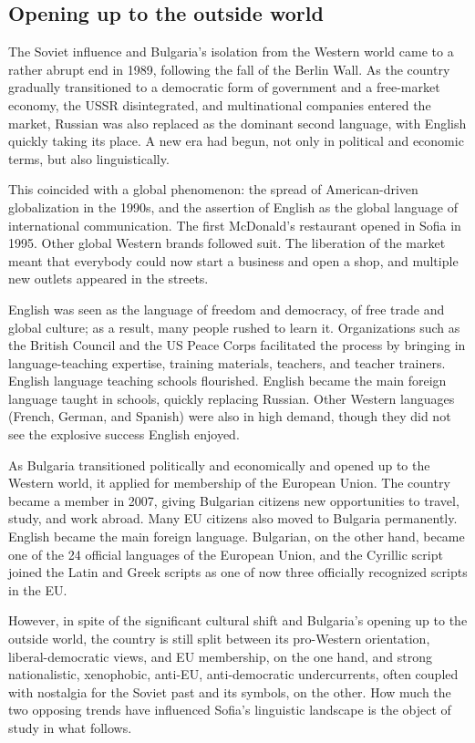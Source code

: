 \documentclass[output=paper]{langscibook}
\begin{document}
\subsection{Opening up to the outside world}
The Soviet influence and Bulgaria’s isolation from the Western world came to a rather abrupt end in 1989, following the fall of the Berlin Wall. As the country gradually transitioned to a democratic form of government and a free-market economy, the USSR disintegrated, and multinational companies entered the market, Russian was also replaced as the dominant second language, with English quickly taking its place. A new era had begun, not only in political and economic terms, but also linguistically.

This coincided with a global phenomenon: the spread of American-driven globalization in the 1990s, and the assertion of English as the global language of international communication. The first McDonald’s restaurant opened in Sofia in 1995. Other global Western brands followed suit. The liberation of the market meant that everybody could now start a business and open a shop, and multiple new outlets appeared in the streets. 

English was seen as the language of freedom and democracy, of free trade and global culture; as a result, many people rushed to learn it. Organizations such as the British Council and the US Peace Corps facilitated the process by bringing in language-teaching expertise, training materials, teachers, and teacher trainers. English language teaching schools flourished. English became the main foreign language taught in schools, quickly replacing Russian. Other Western languages (French, German, and Spanish) were also in high demand, though they did not see the explosive success English enjoyed. 

As Bulgaria transitioned politically and economically and opened up to the Western world, it applied for membership of the European Union. The country became a member in 2007, giving Bulgarian citizens new opportunities to travel, study, and work abroad. Many EU citizens also moved to Bulgaria permanently. English became the main foreign language. Bulgarian, on the other hand, became one of the 24 official languages of the European Union, and the Cyrillic script joined the Latin and Greek scripts as one of now three officially recognized scripts in the EU.

However, in spite of the significant cultural shift and Bulgaria’s opening up to the outside world, the country is still split between its pro-Western orientation, liberal-democratic views, and EU membership, on the one hand, and strong nationalistic, xenophobic, anti-EU, anti-democratic undercurrents, often coupled with nostalgia for the Soviet past and its symbols, on the other. How much the two opposing trends have influenced Sofia’s linguistic landscape is the object of study in what follows.
\end{document}
